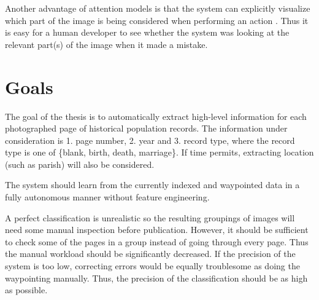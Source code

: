 


Another advantage of attention models is that the system can explicitly visualize which part of the image is being considered when performing an action \cite{AttendAndTell}. Thus it is easy for a human developer to see whether the system was looking at the relevant part(s) of the image when it made a mistake.


\section{Goals}

The goal of the thesis is to automatically extract high-level information for each photographed page of historical population records. The information under consideration is 1. page number, 2. year and 3. record type, where the record type is one of \{blank, birth, death, marriage\}. If time permits, extracting location (such as parish) will also be considered.

The system should learn from the currently indexed and waypointed data in a fully autonomous manner without feature engineering.

A perfect classification is unrealistic so the resulting groupings of images will need some manual inspection before publication. However, it should be sufficient to check some of the pages in a group instead of going through every page. Thus the manual workload should be significantly decreased. If the precision of the system is too low, correcting errors would be equally troublesome as doing the waypointing manually. Thus, the precision of the classification should be as high as possible.


